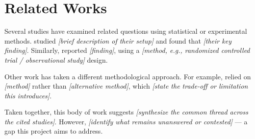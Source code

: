\section{Related Works}
\label{S:related-works}


Several studies have examined related questions using statistical or experimental methods. \citet{smith2020} studied \textit{[brief description of their setup]} and found that \textit{[their key finding]}. Similarly, \citep{jones2019} reported \textit{[finding]}, using a \textit{[method, e.g., randomized controlled trial / observational study]} design.

Other work has taken a different methodological approach. For example, \citet{lee2021} relied on \textit{[method]} rather than \textit{[alternative method]}, which \textit{[state the trade-off or limitation this introduces]}.

Taken together, this body of work suggests \textit{[synthesize the common thread across the cited studies]}. However, \textit{[identify what remains unanswered or contested]} — a gap this project aims to address.

